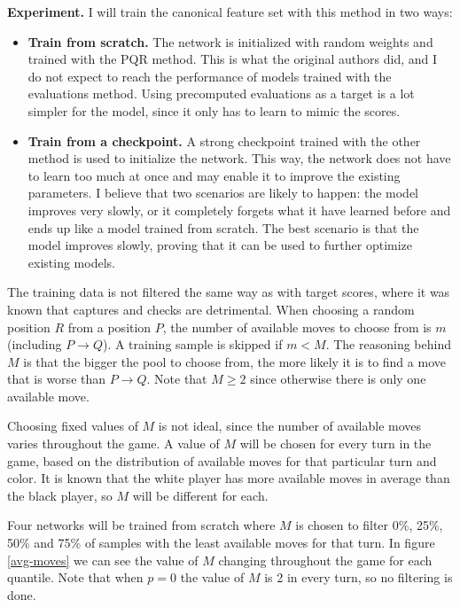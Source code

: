 \textbf{Experiment.} I will train the canonical  feature set with this method in two ways:

\begin{itemize}
\item \textbf{Train from scratch.} The network is initialized with random weights and trained with the PQR method. This is what the original authors did, and I do not expect to reach the performance of models trained with the evaluations method. Using precomputed evaluations as a target is a lot simpler for the model, since it only has to learn to mimic the scores.

\item \textbf{Train from a checkpoint.} A strong checkpoint trained with the other method is used to initialize the network. This way, the network does not have to learn too much at once and may enable it to improve the existing parameters. I believe that two scenarios are likely to happen: the model improves very slowly, or it completely forgets what it have learned before and ends up like a model trained from scratch. The best scenario is that the model improves slowly, proving that it can be used to further optimize existing models.
\end{itemize}

The training data is not filtered the same way as with target scores, where it was known that captures and checks are detrimental. When choosing a random position $R$ from a position $P$, the number of available moves to choose from is $m$ (including $P \rightarrow Q$). A training sample is skipped if $m < M$. The reasoning behind $M$ is that the bigger the pool to choose from, the more likely it is to find a move that is worse than $P \rightarrow Q$. Note that $M \geq 2$ since otherwise there is only one available move.

Choosing fixed values of $M$ is not ideal, since the number of available moves varies throughout the game. A value of $M$ will be chosen for every turn in the game, based on the distribution of available moves for that particular turn and color. It is known that the white player has more available moves in average than the black player, so $M$ will be different for each.

Four networks will be trained from scratch where $M$ is chosen to filter 0\%, 25\%, 50\% and 75\% of samples with the least available moves for that turn. In figure \ref{avg-moves} we can see the value of $M$ changing throughout the game for each quantile. Note that when $p=0$ the value of $M$ is 2 in every turn, so no filtering is done. \\

